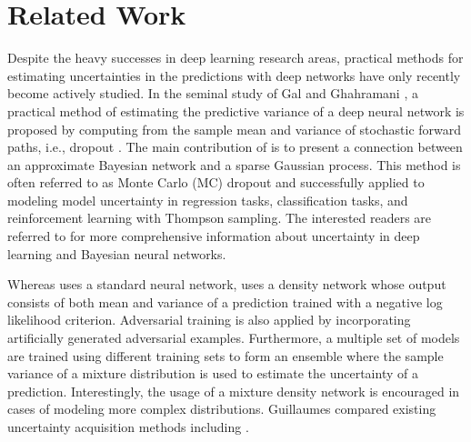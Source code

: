 \documentclass[letterpaper, 10 pt, conference]{ieeeconf}  %
\begin{document}
\section{Related Work}\label{sec:rel}

Despite the heavy successes in deep learning research areas,
practical methods for estimating uncertainties 
in the predictions with deep networks
have only recently become actively studied.
In the seminal study of Gal and Ghahramani \cite{Gal_16},
a practical method of estimating the predictive variance 
of a deep neural network is proposed by
computing from the sample mean and variance of
stochastic forward paths, i.e., dropout \cite{Srivastava_14}.
The main contribution of \cite{Gal_16} 
is to present a connection between 
an approximate Bayesian network
and a sparse Gaussian process.
This method is often referred to as Monte Carlo (MC) dropout
and successfully applied to modeling model uncertainty in 
regression tasks, classification tasks, 
and reinforcement learning with Thompson sampling. 
The interested readers are referred to \cite{Gal_16_thesis}
for more comprehensive information about uncertainty
in deep learning and Bayesian neural networks. 


Whereas \cite{Gal_16} uses a standard neural network, 
\cite{Lakshminarayanan_16} uses
a density network whose output consists 
of both mean and variance of a prediction
trained with a negative log likelihood criterion. 
Adversarial training is also applied by incorporating
artificially generated adversarial examples.
Furthermore, a multiple set of models are trained using
different training sets to form an ensemble where 
the sample variance of a mixture distribution is used
to estimate the uncertainty of a prediction.
Interestingly, the usage of a mixture density network is
encouraged in cases of modeling more complex distributions.
Guillaumes \cite{Brando_17}
compared existing uncertainty acquisition 
methods including \cite{Lakshminarayanan_16, Gal_16}.
\end{document}
